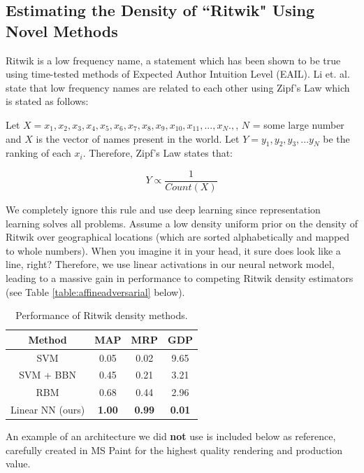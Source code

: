 \documentclass[]{article}
\begin{document}
\subsection{Estimating the Density of ``Ritwik" Using Novel Methods}
Ritwik is a low frequency name, a statement which has been shown to be true using time-tested methods of Expected Author Intuition Level (EAIL). Li et. al. \cite{Baby} state that low frequency names are related to each other using Zipf's Law which is stated as follows:

\vspace{2mm}
Let $X = {x_1, x_2, x_3, x_4, x_5, x_6, x_7, x_8, x_9, x_{10}, x_{11}, ... , x_N}.,$, $N$ = some large number and $X$ is the vector of names present in the world. Let $Y = {y_1, y_2, y_3, ... y_N}$ be the ranking of each $x_i$. Therefore, Zipf's Law states that:

\begin{equation}
Y \propto \frac{1}{Count(X)}
\end{equation}

We completely ignore this rule and use deep learning since representation learning solves all problems. Assume a low density uniform prior on the density of Ritwik over geographical locations (which are sorted alphabetically and mapped to whole numbers). When you imagine it in your head, it sure does look like a line, right? Therefore, we use linear activations in our neural network model, leading to a massive gain in performance to competing Ritwik density estimators (see Table \ref{table:affineadversarial} below).

\begin{table}[h]
\centering
\begin{tabular}{|c|c|c|c|}
	\hline
	\textbf{Method} & \textbf{MAP} & \textbf{MRP} & \textbf{GDP} \\
	\hline
	SVM & 0.05 & 0.02 & 9.65 \\
	\hline
	SVM + BBN & 0.45 & 0.21 & 3.21 \\
	\hline
	RBM & 0.68 & 0.44 & 2.96 \\
	\hline
	Linear NN (ours) & \textbf{1.00} & \textbf{0.99} & \textbf{0.01}\\
	\hline
\end{tabular}
\caption{Performance of Ritwik density methods.}
\label{table:densitycomp}
\end{table}

An example of an architecture we did \textbf{not} use is included below as reference, carefully created in MS Paint for the highest quality rendering and production value.
\end{document}
